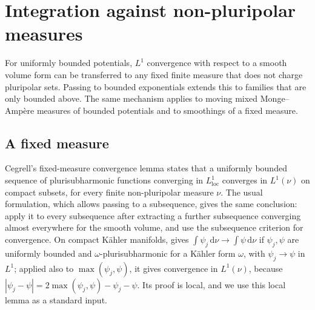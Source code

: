 \section{Integration against non-pluripolar measures}
\label{sec:psh-fixed-measure}

For uniformly bounded potentials, $L^1$ convergence with respect to a smooth volume form can be transferred to any fixed finite measure that does not charge pluripolar sets. Passing to bounded exponentials extends this to families that are only bounded above. The same mechanism applies to moving mixed Monge--Amp\`ere measures of bounded potentials and to smoothings of a fixed measure.

\subsection{A fixed measure}

Cegrell's fixed-measure convergence lemma states that a uniformly bounded sequence of plurisubharmonic functions converging in $L^1_{\mathrm{loc}}$ converges in $L^1(\nu)$ on compact subsets, for every finite non-pluripolar measure $\nu$. The usual formulation, which allows passing to a subsequence, gives the same conclusion: apply it to every subsequence after extracting a further subsequence converging almost everywhere for the smooth volume, and use the subsequence criterion for convergence. On compact K\"ahler manifolds, \cite[Lemma~11.5]{GZ17} gives $\int\psi_j\,\mathrm{d}\nu\to\int\psi\,\mathrm{d}\nu$ if $\psi_j,\psi$ are uniformly bounded and $\omega$-plurisubharmonic for a K\"ahler form $\omega$, with $\psi_j\to\psi$ in $L^1$; applied also to $\max(\psi_j,\psi)$, it gives convergence in $L^1(\nu)$, because $|\psi_j-\psi|=2\max(\psi_j,\psi)-\psi_j-\psi$. Its proof is local, and we use this local lemma as a standard input.

